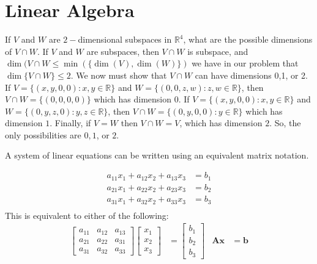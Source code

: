 \documentclass[crop=false,class=book,oneside]{standalone}                      %
\begin{document}
    \section{Linear Algebra}
        \begin{lexample}
            If $V$ and $W$ are $2-$dimensional subspaces in
            $\mathbb{R}^{4}$, what are the possible dimensions of
            $V\cap W$. If $V$ and $W$ are subspaces, then
            ${V}\cap{W}$ is subspace, and
            $\dim({V}\cap{W}\leq\min(\{\dim(V),\dim(W)\})$
            we have in our problem that $\dim\{V\cap W\}\leq 2$. We
            now must show that $V\cap W$ can have dimensions 0,1, or
            2. If $V=\{(x,y,0,0):x,y\in\mathbb{R}\}$ and
            $W=\{(0,0,z,w):z,w\in \mathbb{R}\}$, then
            ${V}\cap{W}=\{(0,0,0,0)\}$ which has dimension $0$.
            If $V=\{(x,y,0,0):x,y\in\mathbb{R}\}$ and
            $W=\{(0,y,z,0):y,z\in\mathbb{R}\}$,
            then ${V}\cap{W}=\{(0,y,0,0):y\in\mathbb{R}\}$
            which has dimension $1$. Finally, if $V=W$ then
            ${V}\cap{W}=V$, which has dimension $2$. So, the only
            possibilities are $0,1$, or $2$.
        \end{lexample}
        A system of linear equations can be written
        using an equivalent matrix notation.
        \begin{example}
            \begin{align*}
                a_{11}x_{1}+a_{12}x_{2}+a_{13}x_{3}&=b_{1}\\
                a_{21}x_{1}+a_{22}x_{2}+a_{23}x_{3}&=b_{2}\\
                a_{31}x_{1}+a_{32}x_{2}+a_{33}x_{3}&=b_{3}\\
            \end{align*}
            This is equivalent to either of the following:
            \begin{align*}
                \begin{bmatrix}
                    a_{11}&a_{12}&a_{13}\\
                    a_{21}&a_{22}&a_{31}\\
                    a_{31}&a_{32}&a_{33}
                \end{bmatrix}
                \begin{bmatrix}
                    x_{1}\\
                    x_{2}\\
                    x_{3}
                \end{bmatrix}
                &=
                \begin{bmatrix}
                    b_{1}\\
                    b_{2}\\
                    b_{3}
                \end{bmatrix}
                &
                \mathbf{A}\mathbf{x}
                &=\mathbf{b}
            \end{align*}
        \end{example}
\end{document}
